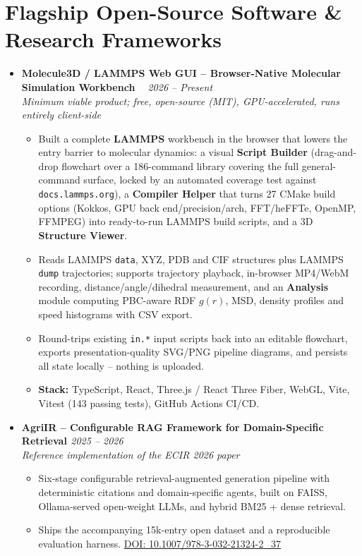 \documentclass[a4paper,10pt]{article}
\newcommand{\resumeProject}[4]{
    \item\small{
        \textbf{#1} \hfill \textit{#2}\\
        \textit{#3}\\
        \begin{itemize}[leftmargin=1.5em,label=\textbullet,nosep,itemsep=0.5pt]
            #4
        \end{itemize}
    }\vspace{2pt}
}
\newcommand{\compactSection}[2]{
    \section{#1}
    \vspace{-0.1cm}
    #2
    \vspace{-0.2cm}
}
\begin{document}
\compactSection{Flagship Open-Source Software \& Research Frameworks}{
\begin{itemize}[leftmargin=*,label={},itemsep=4pt]

    \resumeProject{Molecule3D / LAMMPS Web GUI -- Browser-Native Molecular Simulation Workbench \href{https://github.com/Shuvam-Banerji-Seal/lammps-web-gui}{\faGithub}\ \href{https://shuvam-banerji-seal.github.io/lammps-web-gui/}{\faGlobe}}{2026 -- Present}
    {Minimum viable product; free, open-source (MIT), GPU-accelerated, runs entirely client-side}
    {\item Built a complete \textbf{LAMMPS} workbench in the browser that lowers the entry barrier to molecular dynamics: a visual \textbf{Script Builder} (drag-and-drop flowchart over a 186-command library covering the full general-command surface, locked by an automated coverage test against \texttt{docs.lammps.org}), a \textbf{Compiler Helper} that turns 27 CMake build options (Kokkos, GPU back end/precision/arch, FFT/heFFTe, OpenMP, FFMPEG) into ready-to-run LAMMPS build scripts, and a 3D \textbf{Structure Viewer}.
    \item Reads LAMMPS \texttt{data}, XYZ, PDB and CIF structures plus LAMMPS \texttt{dump} trajectories; supports trajectory playback, in-browser MP4/WebM recording, distance/angle/dihedral measurement, and an \textbf{Analysis} module computing PBC-aware RDF $g(r)$, MSD, density profiles and speed histograms with CSV export.
    \item Round-trips existing \texttt{in.*} input scripts back into an editable flowchart, exports presentation-quality SVG/PNG pipeline diagrams, and persists all state locally -- nothing is uploaded.
    \item \textbf{Stack:} TypeScript, React, Three.js / React Three Fiber, WebGL, Vite, Vitest (143 passing tests), GitHub Actions CI/CD.}

    \resumeProject{AgriIR -- Configurable RAG Framework for Domain-Specific Retrieval \href{https://github.com/Shuvam-Banerji-Seal/AgriIR}{\faGithub}}{2025 -- 2026}
    {Reference implementation of the ECIR 2026 paper}
    {\item Six-stage configurable retrieval-augmented generation pipeline with deterministic citations and domain-specific agents, built on FAISS, Ollama-served open-weight LLMs, and hybrid BM25 + dense retrieval.
    \item Ships the accompanying 15k-entry open dataset and a reproducible evaluation harness. \href{https://doi.org/10.1007/978-3-032-21324-2_37}{\small DOI: 10.1007/978-3-032-21324-2\_37}}


\end{itemize}}
\end{document}
